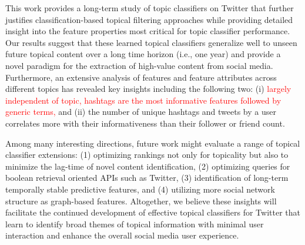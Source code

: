 
This work provides a long-term study of topic classifiers on Twitter that further justifies classification-based topical filtering approaches while providing detailed insight into the feature properties most critical for topic classifier performance.
%
Our results suggest that these learned topical classifiers generalize well
to unseen future topical content over a long time horizon (i.e., one year)
and provide a novel paradigm for the
extraction of high-value content from social media. Furthermore, an
extensive analysis of features and feature attributes across different
topics has revealed key insights including the following two: 
(i) \textcolor{red}{largely independent of
topic, hashtags are the most informative features followed by  generic terms,} and (ii) the number of unique hashtags and
tweets by a user correlates more with their informativeness than their
follower or friend count.

Among many interesting directions, future work might evaluate a range of 
topical classifier extensions: (1)
optimizing rankings not only for topicality but also to minimize the
lag-time of novel content identification, (2) optimizing queries for
boolean retrieval oriented APIs such as Twitter, (3) identification of 
long-term temporally stable predictive features, and (4) utilizing
more social network structure as graph-based 
features.  Altogether, we believe these insights will facilitate 
the continued development of effective topical classifiers for Twitter that learn to
identify broad themes of topical information with minimal user
interaction and enhance the overall social media user experience.

